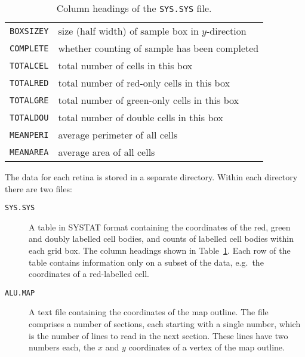 \documentclass{article}
\begin{document}
\begin{table}
\begin{tabular}{ll}
    \texttt{BOXSIZEY} & size (half width) of sample box in $y$-direction \\
    \texttt{COMPLETE} & whether counting of sample has been completed\\
    \texttt{TOTALCEL} & total number of cells in this box\\
    \texttt{TOTALRED} & total number of red-only cells in this box\\
    \texttt{TOTALGRE} & total number of green-only cells in this box\\
    \texttt{TOTALDOU} & total number of double cells in this box\\
    \texttt{MEANPERI} & average perimeter of all cells \\
    \texttt{MEANAREA} & average area of all cells \\
  \end{tabular}
  \caption{Column headings of the \texttt{SYS.SYS} file.}
  \label{tab:data-format}
\end{table}

The data for each retina is stored in a separate directory. Within
each directory there are two files:
\begin{description}
\item[\texttt{SYS.SYS}] A table in SYSTAT format containing the
  coordinates of the red, green and doubly labelled cell bodies, and
  counts of labelled cell bodies within each grid box. The column
  headings shown in Table~\ref{tab:data-format}.  Each row of the
  table contains information only on a subset of the data, e.g.\ the
  coordinates of a red-labelled cell.
\item[\texttt{ALU.MAP}] A text file containing the coordinates of the
  map outline. The file comprises a number of sections, each starting
  with a single number, which is the number of lines to read in the
  next section. These lines have two numbers each, the $x$ and $y$
  coordinates of a vertex of the map outline.
\end{description}



\end{document}
